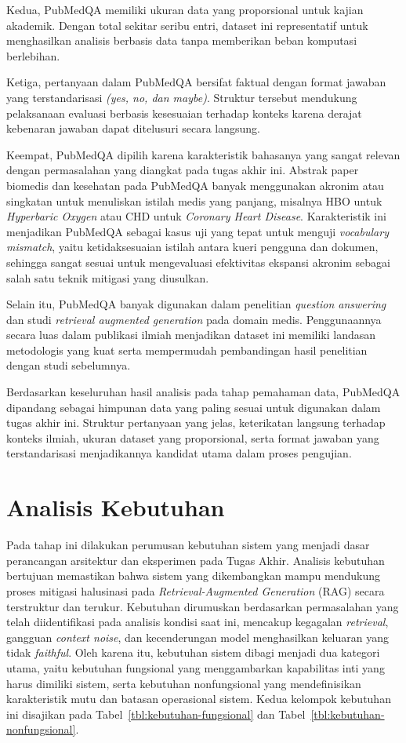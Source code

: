 Kedua, PubMedQA memiliki ukuran data yang proporsional untuk kajian akademik. Dengan total sekitar seribu entri, dataset ini representatif untuk menghasilkan analisis berbasis data tanpa memberikan beban komputasi berlebihan.

Ketiga, pertanyaan dalam PubMedQA bersifat faktual dengan format jawaban yang terstandarisasi \textit{(yes, no, dan maybe)}. Struktur tersebut mendukung pelaksanaan evaluasi berbasis kesesuaian terhadap konteks karena derajat kebenaran jawaban dapat ditelusuri secara langsung.

Keempat, PubMedQA dipilih karena karakteristik bahasanya yang sangat relevan dengan permasalahan yang diangkat pada tugas akhir ini. Abstrak paper biomedis dan kesehatan pada PubMedQA banyak menggunakan akronim atau singkatan untuk menuliskan istilah medis yang panjang, misalnya HBO untuk \textit{Hyperbaric Oxygen} atau CHD untuk \textit{Coronary Heart Disease}. Karakteristik ini menjadikan PubMedQA sebagai kasus uji yang tepat untuk menguji \textit{vocabulary mismatch}, yaitu ketidaksesuaian istilah antara kueri pengguna dan dokumen, sehingga sangat sesuai untuk mengevaluasi efektivitas ekspansi akronim sebagai salah satu teknik mitigasi yang diusulkan.

Selain itu, PubMedQA banyak digunakan dalam penelitian \textit{question answering} dan studi \textit{retrieval augmented generation} pada domain medis. Penggunaannya secara luas dalam publikasi ilmiah menjadikan dataset ini memiliki landasan metodologis yang kuat serta mempermudah pembandingan hasil penelitian dengan studi sebelumnya.

Berdasarkan keseluruhan hasil analisis pada tahap pemahaman data, PubMedQA dipandang sebagai himpunan data yang paling sesuai untuk digunakan dalam tugas akhir ini. Struktur pertanyaan yang jelas, keterikatan langsung terhadap konteks ilmiah, ukuran dataset yang proporsional, serta format jawaban yang terstandarisasi menjadikannya kandidat utama dalam proses pengujian.


\section{Analisis Kebutuhan}
\label{sec:analisis-kebutuhan}

Pada tahap ini dilakukan perumusan kebutuhan sistem yang menjadi dasar perancangan arsitektur dan eksperimen pada Tugas Akhir. Analisis kebutuhan bertujuan memastikan bahwa sistem yang dikembangkan mampu mendukung proses mitigasi halusinasi pada \textit{Retrieval-Augmented Generation} (RAG) secara terstruktur dan terukur. Kebutuhan dirumuskan berdasarkan permasalahan yang telah diidentifikasi pada analisis kondisi saat ini, mencakup kegagalan \textit{retrieval}, gangguan \textit{context noise}, dan kecenderungan model menghasilkan keluaran yang tidak \textit{faithful}. Oleh karena itu, kebutuhan sistem dibagi menjadi dua kategori utama, yaitu kebutuhan fungsional yang menggambarkan kapabilitas inti yang harus dimiliki sistem, serta kebutuhan nonfungsional yang mendefinisikan karakteristik mutu dan batasan operasional sistem. Kedua kelompok kebutuhan ini disajikan pada Tabel~\ref{tbl:kebutuhan-fungsional} dan Tabel~\ref{tbl:kebutuhan-nonfungsional}.

